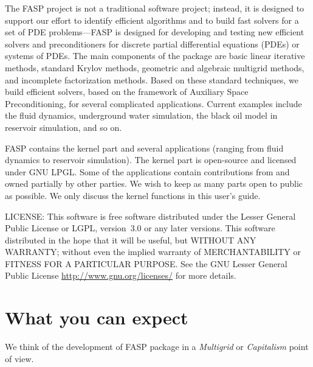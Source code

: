 \documentclass[11pt]{memoir}
\begin{document}
The FASP project is not a traditional software project; instead, it is designed to support our effort to identify efficient algorithms and to build fast solvers for a set of PDE problems---FASP is designed for developing and testing new efficient solvers and preconditioners for discrete partial differential equations (PDEs) or systems of PDEs. The main components of the package are basic linear iterative methods, standard Krylov methods, geometric and algebraic multigrid methods, and incomplete factorization methods. Based on these standard techniques, we build efficient solvers, based on the framework of Auxiliary Space Preconditioning, for several complicated applications. Current examples include the fluid dynamics, underground water simulation, the black oil model in reservoir simulation, and so on. 

FASP contains the kernel part and several applications (ranging from fluid dynamics to reservoir simulation). The kernel part is open-source and licensed under GNU LPGL. Some of the applications contain contributions from and owned partially by other parties. We wish to keep as many parts open to public as possible. We only discuss the kernel functions in this user's guide.

\begin{snugshade}\noindent
LICENSE: This software is free software distributed under the Lesser General Public 
License or LGPL, version~3.0 or any later versions. This software distributed 
in the hope that it will be useful, but WITHOUT ANY WARRANTY; without even 
the implied warranty of MERCHANTABILITY or FITNESS FOR A PARTICULAR PURPOSE. See the GNU Lesser General Public License \url{http://www.gnu.org/licenses/} for more details.
\end{snugshade}

\section{What you can expect}\label{sec:idea}

We think of the development of FASP package in a \emph{Multigrid} or \emph{Capitalism} point of view.
\end{document}
